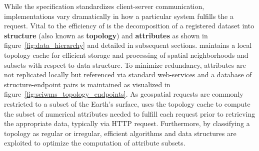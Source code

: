While the \ogcwms{} specification standardizes client-server
communication, implementations vary dramatically in how a
particular system fulfills the a \wms{} request. Vital to
the efficiency of \sciwms{} is the decomposition of a registered
dataset into \textbf{structure} (also known as \textbf{topology}) and
\textbf{attributes} as shown in figure~\ref{fig:data_hierarchy} and
detailed in subsequent sections. \Sciwms{} maintains a local topology
cache for efficient storage and processing of spatial neighborhoods
and subsets with respect to data structure. To minimize redundancy,
attributes are not replicated locally but referenced via standard
web-services and a database of structure-endpoint pairs is maintained
as visualized in figure~\ref{fig:sciwms_topology_endpoints}. As
geospatial \wms{} requests are commonly restricted to a subset of the
Earth's surface, \sciwms{} uses the topology cache to compute the
subset of numerical attributes needed to fulfill each request prior to
retrieving the appropriate data, typically via HTTP request. Furthermore, by
classifying a topology as regular or irregular, efficient algorithms
and data structures are exploited to optimize the computation of
attribute subsets.
